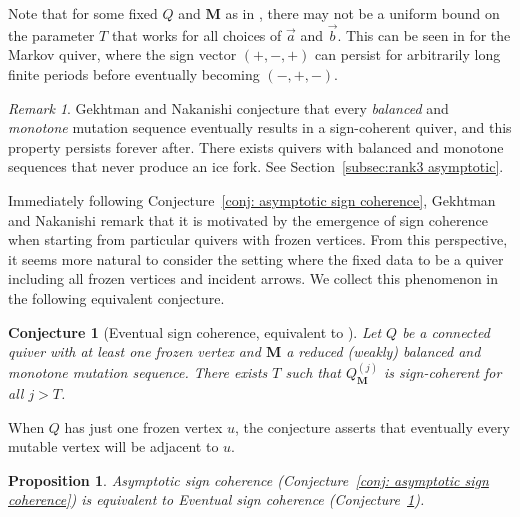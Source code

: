 \documentclass[12pt]{amsart}
\newtheorem{prop}[thm]{Proposition}
\newtheorem{conj}[thm]{Conjecture}
\theoremstyle{definition}
\theoremstyle{remark}
\newtheorem{rem}[thm]{Remark}
\numberwithin{equation}{section}
\begin{document}
    
Note that for some fixed $Q$ and $\mathbf M$ as in , there may not be a uniform bound on the parameter $T$ that works for all choices of $\vec{a}$ and $\vec{b}$.  This can be seen in \cite[Section 4]{GekhtmanNakanishi} for the Markov quiver, where the sign vector $(+,-,+)$ can persist for arbitrarily long finite periods before eventually becoming $(-,+,-)$.


\begin{rem}
Gekhtman and Nakanishi \cite{GekhtmanNakanishi} conjecture that every \emph{balanced} and \emph{monotone} mutation sequence eventually results in a sign-coherent quiver, and this property persists forever after.
There exists quivers with balanced and monotone sequences that never produce an ice fork. See Section~\ref{subsec:rank3 asymptotic}.
\end{rem}

Immediately following Conjecture~\ref{conj: asymptotic sign coherence}, Gekhtman and Nakanishi remark that it is motivated by the emergence of sign coherence when starting from particular quivers with frozen vertices.  From this perspective, it seems more natural to consider the setting where the fixed data to be a quiver including all frozen vertices and incident arrows.  We collect this phenomenon in the following equivalent conjecture.

\begin{conj}[Eventual sign coherence, equivalent to {\cite[Conjecture 2.3]{GekhtmanNakanishi}}]
\label{conj: eventual sign coherence}
Let $Q$ be a connected quiver with at least one frozen vertex and $\mathbf M$ a reduced (weakly) balanced and monotone mutation sequence. There exists $T$ such that $Q^{(j)}_{\mathbf M}$ is sign-coherent for all $j>T$.
\end{conj}

When $Q$ has just one frozen vertex $u$, the conjecture asserts that eventually every mutable vertex will be adjacent to $u$.


\begin{prop}
Asymptotic sign coherence (Conjecture~\ref{conj: asymptotic sign coherence}) is equivalent to 
Eventual sign coherence (Conjecture~\ref{conj: eventual sign coherence}).
\end{prop}
\end{document}
